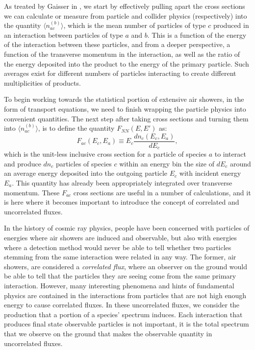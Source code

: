 As treated by Gaisser in \cite{crapp}, we start by effectively pulling apart the cross sections we can calculate or measure from particle and collider physics (respectively) into the quantity $\langle n^{(b)}_{ac}\rangle$, which is the mean number of particles of type $c$ produced in an interaction between particles of type $a$ and $b$. This is a function of the energy of the interaction between these particles, and from a deeper perspective, a function of the transverse momentum in the interaction, as well as the ratio of the energy deposited into the product to the energy of the primary particle. Such averages exist for different numbers of particles interacting to create different multiplicities of products.

To begin working towards the statistical portion of extensive air showers, in the form of transport equations, we need to finish wrapping the particle physics into convenient quantities. The next step after taking cross sections and turning them into $\langle n^{(b)}_{ac}\rangle$, is to define the quantity $F_{NN}(E,E')$ as:
$$F_{ac}(E_c,E_a)\equiv E_c \frac{dn_c(E_c,E_a)}{dE_c},$$
which is the unit-less inclusive cross section for a particle of species $a$ to interact and produce $dn_c$ particles of species $c$ within an energy bin the size of $dE_c$ around an average energy deposited into the outgoing particle $E_c$ with incident energy $E_a$. This quantity has already been appropriately integrated over transverse momentum. These $F_{ac}$ cross sections are useful in a number of calculations, and it is here where it becomes important to introduce the concept of correlated and uncorrelated fluxes. 

In the history of cosmic ray physics, people have been concerned with particles of energies where air showers are induced and observable, but also with energies where a detection method would never be able to tell whether two particles stemming from the same interaction were related in any way. The former, air showers, are considered a \textit{correlated flux}, where an observer on the ground would be able to tell that the particles they are seeing come from the same primary interaction. However, many interesting phenomena and hints of fundamental physics are contained in the interactions from particles that are not high enough energy to cause correlated fluxes. In these uncorrelated fluxes, we consider the production that a portion of a species' spectrum induces. Each interaction that produces final state observable particles is not important, it is the total spectrum that we observe on the ground that makes the observable quantity in uncorrelated fluxes.

